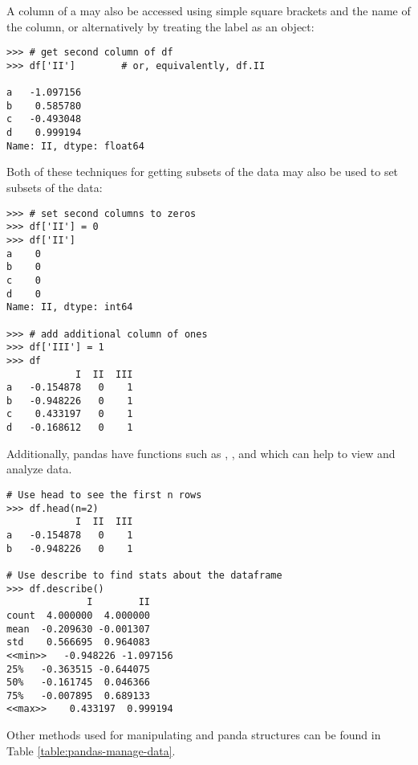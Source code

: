A column of a  may also be accessed using simple square
brackets and the name of the column, or alternatively by treating the label
as an object:
\begin{lstlisting}
>>> # get second column of df
>>> df['II']        # or, equivalently, df.II

a   -1.097156
b    0.585780
c   -0.493048
d    0.999194
Name: II, dtype: float64
\end{lstlisting}

Both of these techniques for getting subsets of the data may also be used to set
subsets of the data:

\begin{lstlisting}
>>> # set second columns to zeros
>>> df['II'] = 0
>>> df['II']
a    0
b    0
c    0
d    0
Name: II, dtype: int64

>>> # add additional column of ones
>>> df['III'] = 1
>>> df
            I  II  III
a   -0.154878   0    1
b   -0.948226   0    1
c    0.433197   0    1
d   -0.168612   0    1
\end{lstlisting}

Additionally, pandas have functions such as , , and  which can help to view and analyze data.

\begin{lstlisting}
# Use head to see the first n rows
>>> df.head(n=2)
            I  II  III
a   -0.154878   0    1
b   -0.948226   0    1

# Use describe to find stats about the dataframe
>>> df.describe()
              I        II
count  4.000000  4.000000
mean  -0.209630 -0.001307
std    0.566695  0.964083
<<min>>   -0.948226 -1.097156
25%   -0.363515 -0.644075
50%   -0.161745  0.046366
75%   -0.007895  0.689133
<<max>>    0.433197  0.999194

\end{lstlisting}

Other methods used for manipulating  and  panda structures can be found in Table \ref{table:pandas-manage-data}.

